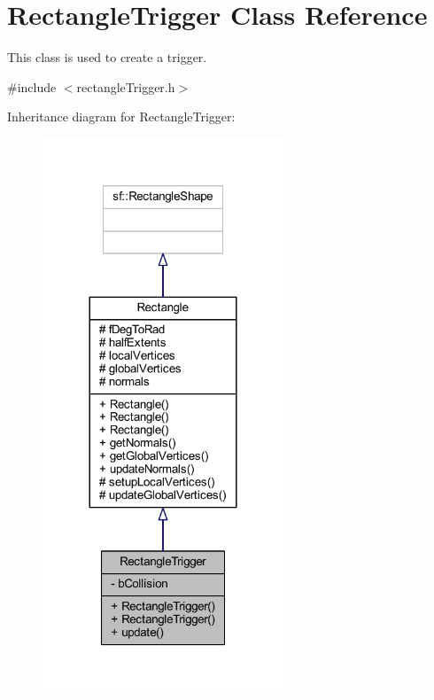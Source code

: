 \hypertarget{class_rectangle_trigger}{}\section{Rectangle\+Trigger Class Reference}
\label{class_rectangle_trigger}


This class is used to create a trigger.  




{\ttfamily \#include $<$rectangle\+Trigger.\+h$>$}



Inheritance diagram for Rectangle\+Trigger\+:\nopagebreak
\begin{figure}[H]
\begin{center}
\leavevmode
\includegraphics[width=204pt]{class_rectangle_trigger__inherit__graph}
\end{center}
\end{figure}


